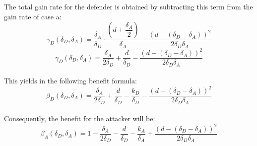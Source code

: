 The total gain rate for the defender is obtained by subtracting this term from the gain rate of case a:
 \begin{equation*}
\gamma_{D}(\delta_{D},\delta_{A}) = \dfrac{\delta_{A}}{\delta_{D}} \cdot \dfrac{(d+\dfrac{\delta_{A}}{2})}{\delta_{A}} - \dfrac{(d - (\delta_{D} - \delta_{A}))^{2}}{2 \delta_{D} \delta_{A}}
\end{equation*}
\begin{equation*}
\gamma_{D}(\delta_{D},\delta_{A}) = \dfrac{\delta_{A}}{2\delta_{D}} + \dfrac{d}{\delta_{D}} - \dfrac{(d - (\delta_{D} - \delta_{A}))^{2}}{2 \delta_{D} \delta_{A}}
\end{equation*}\\
This yields in the following benefit formula:
\begin{equation}\label{benfcase2b:defender}
\beta_{D}(\delta_{D},\delta_{A}) = \dfrac{\delta_{A}}{2\delta_{D}} + \dfrac{d}{\delta_{D}} - \dfrac{k_{D}}{ \delta_{D}} - \dfrac{(d - (\delta_{D} - \delta_{A}))^{2}}{2 \delta_{D} \delta_{A}}
\end{equation}\\
 
Consequently, the benefit for the attacker will be:
\begin{equation}\label{benfcase2b:attacker}
\beta_{A}(\delta_{D},\delta_{A}) = 1 -\dfrac{\delta_{A}}{2\delta_{D}} - \dfrac{d}{\delta_{D}} - \dfrac{k_{A}}{ \delta_{A}} + \dfrac{(d - (\delta_{D} - \delta_{A}))^{2}}{2 \delta_{D} \delta_{A}}
\end{equation}\\

